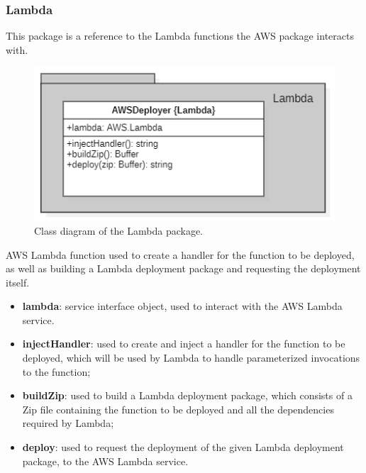 	\subsubsection{Lambda}
	This package is a reference to the Lambda functions the AWS package interacts with.
	\begin{figure} [h!]
		\centering
		\includegraphics[width=0.7\linewidth]{diagrammi/etherless-server/Lambda}
		\caption{Class diagram of the Lambda package.}
	\end{figure}
	AWS Lambda function used to create a handler for the function to be deployed, as well as building a Lambda deployment package and requesting the deployment itself.
	\begin{itemize}
		\item \textbf{lambda}: service interface object, used to interact with the AWS Lambda service.
	\end{itemize}
	\begin{itemize}
		\item \textbf{injectHandler}: used to create and inject a handler for the function to be deployed, which will be used by Lambda to handle parameterized invocations to the function;
		\item \textbf{buildZip}: used to build a Lambda deployment package, which consists of a Zip file containing the function to be deployed and all the dependencies required by Lambda;
		\item \textbf{deploy}: used to request the deployment of the given Lambda deployment package, to the AWS Lambda service.
	\end{itemize}

